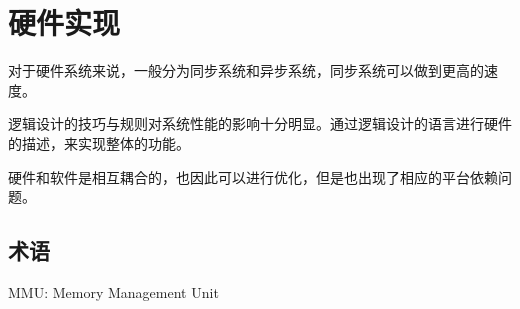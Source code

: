 \documentclass[cn,11pt,chinese,black,simple]{../elegantbook}
\begin{document}
\fi 
\def\chapname{06hw}

\chapter{硬件实现}

对于硬件系统来说，一般分为同步系统和异步系统，同步系统可以做到更高的速度。


逻辑设计的技巧与规则对系统性能的影响十分明显。通过逻辑设计的语言进行硬件的描述，来实现整体的功能。


硬件和软件是相互耦合的，也因此可以进行优化，但是也出现了相应的平台依赖问题。

\section*{术语}

MMU: Memory Management Unit


\let\chapname\undefined
\ifx\mainclass\undefined
\end{document}
